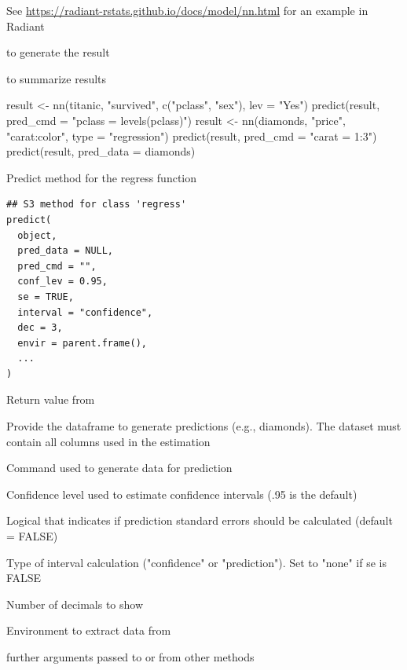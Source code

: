 \documentclass[a4paper]{book}
\begin{document}
%
\begin{Details}
See \url{https://radiant-rstats.github.io/docs/model/nn.html} for an example in Radiant
\end{Details}
%
\begin{SeeAlso}
 to generate the result

 to summarize results
\end{SeeAlso}
%
\begin{Examples}
\begin{ExampleCode}
result <- nn(titanic, "survived", c("pclass", "sex"), lev = "Yes")
predict(result, pred_cmd = "pclass = levels(pclass)")
result <- nn(diamonds, "price", "carat:color", type = "regression")
predict(result, pred_cmd = "carat = 1:3")
predict(result, pred_data = diamonds) %
\end{ExampleCode}
\end{Examples}
%
\begin{Description}
Predict method for the regress function
\end{Description}
%
\begin{Usage}
\begin{verbatim}
## S3 method for class 'regress'
predict(
  object,
  pred_data = NULL,
  pred_cmd = "",
  conf_lev = 0.95,
  se = TRUE,
  interval = "confidence",
  dec = 3,
  envir = parent.frame(),
  ...
)
\end{verbatim}
\end{Usage}
%
\begin{Arguments}
\begin{ldescription}
\item[\code{object}] Return value from 

\item[\code{pred\_data}] Provide the dataframe to generate predictions (e.g., diamonds). The dataset must contain all columns used in the estimation

\item[\code{pred\_cmd}] Command used to generate data for prediction

\item[\code{conf\_lev}] Confidence level used to estimate confidence intervals (.95 is the default)

\item[\code{se}] Logical that indicates if prediction standard errors should be calculated (default = FALSE)

\item[\code{interval}] Type of interval calculation ("confidence" or "prediction"). Set to "none" if se is FALSE

\item[\code{dec}] Number of decimals to show

\item[\code{envir}] Environment to extract data from

\item[\code{...}] further arguments passed to or from other methods
\end{ldescription}
\end{Arguments}
\end{document}
